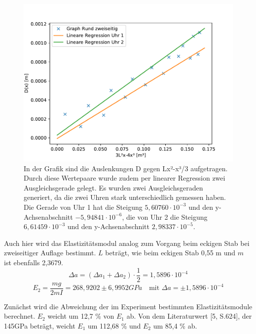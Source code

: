 \documentclass[titlepage = firstcover]{scrartcl}
\begin{document}
      \begin{figure}[h]
        \centering
        \includegraphics[width=0.7\linewidth]{rzwei.pdf}
        \caption{In der Grafik sind die Auslenkungen D gegen Lx²-x³/3 aufgetragen. Durch diese Wertepaare wurde zudem per linearer Regression zwei Ausgleichsgerade gelegt. Es wurden zwei Ausgleichsgeraden generiert, da die zwei Uhren stark unterschiedlich gemessen haben. Die Gerade von Uhr 1 hat die Steigung $5,60760\cdot10^{-3}$ und den y-Achsenabschnitt $-5,94841\cdot10^{-6}$, die von Uhr 2 die Steigung $6,61459\cdot10^{-3}$ und den y-Achsenabschnitt $2,98337\cdot10^{-5}$.}
        \label{fig:graphRzwei}
      \end{figure}
      Auch hier wird das Elastizitätsmodul analog zum Vorgang beim eckigen Stab bei zweiseitiger Auflage bestimmt. $L$ beträgt,
      wie beim eckigen Stab 0,55 m und $m$ ist ebenfalls 2,3679.
      \begin{equation*}
        \Delta a = (\Delta a_1 + \Delta a_2) \cdot \frac{1}{2} = 1,5896 \cdot 10^{-4}
      \end{equation*}
      \begin{equation*}
        E_2 = \frac{mg}{2mI} = 268,9202 \pm 6,9952 GPa \quad \text{mit } \Delta a = \pm 1,5896 \cdot 10^{-4}
      \end{equation*}

      Zunächst wird die Abweichung der im Experiment bestimmten Elastizitätsmodule berechnet. $E_2$ weicht um 12,7 \% von $E_1$ ab.
      Von dem Literaturwert [5, S.624], der 145GPa beträgt, weicht $E_1$ um 112,68 \% und $E_2$ um 85,4 \% ab.

      \FloatBarrier

    \newpage
\end{document}
